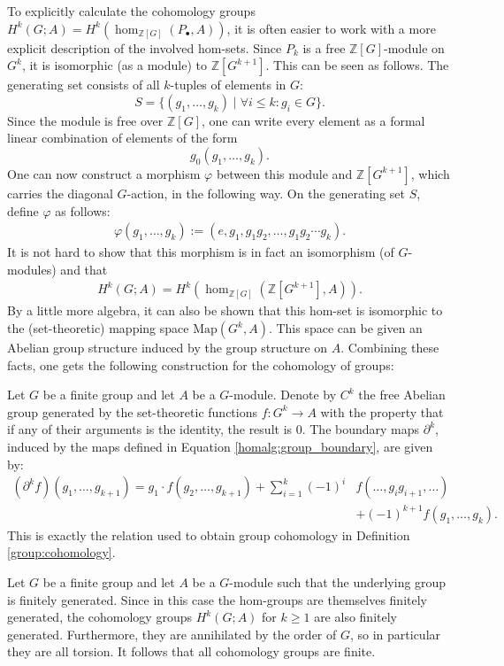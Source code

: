 	To explicitly calculate the cohomology groups $H^k(G;A) = H^k(\hom_{\mathbb{Z}[G]}(P_\bullet,A))$, it is often easier to work with a more explicit description of the involved hom-sets. Since $P_k$ is a free $\mathbb{Z}[G]$-module on $G^k$, it is isomorphic (as a module) to $\mathbb{Z}[G^{k+1}]$. This can be seen as follows. The generating set consists of all $k$-tuples of elements in $G$: \[S=\{(g_1,\ldots,g_k)\mid\forall i\leq k:g_i\in G\}.\] Since the module is free over $\mathbb{Z}[G]$, one can write every element as a formal linear combination of elements of the form \[g_0(g_1,\ldots,g_k).\] One can now construct a morphism $\varphi$ between this module and $\mathbb{Z}[G^{k+1}]$, which carries the diagonal $G$-action, in the following way. On the generating set $S$, define $\varphi$ as follows:
	\begin{gather}
		\varphi(g_1,\ldots,g_k) := (e,g_1,g_1g_2,\ldots,g_1g_2\cdots g_k).
	\end{gather}
	It is not hard to show that this morphism is in fact an isomorphism (of $G$-modules) and that
	\begin{gather}
		H^k(G;A) = H^k(\hom_{\mathbb{Z}[G]}(\mathbb{Z}[G^{k+1}],A)).
	\end{gather}
	By a little more algebra, it can also be shown that this hom-set is isomorphic to the (set-theoretic) mapping space $\mathrm{Map}(G^k,A)$. This space can be given an Abelian group structure induced by the group structure on $A$. Combining these facts, one gets the following construction for the cohomology of groups:
	\begin{construct}
		Let $G$ be a finite group and let $A$ be a $G$-module. Denote by $C^k$ the free Abelian group generated by the set-theoretic functions $f:G^k\rightarrow A$ with the property that if any of their arguments is the identity, the result is 0. The boundary maps $\partial^k$, induced by the maps defined in Equation \eqref{homalg:group_boundary}, are given by:
		\begin{align}
			(\partial^k f)(g_1,\ldots,g_{k+1}) = g_1\cdot f(g_2,\ldots,g_{k+1}) + \sum_{i=1}^k(-1)^i&f(\ldots,g_ig_{i+1},\ldots)\\
            &+(-1)^{k+1}f(g_1,\ldots,g_k).\nonumber
		\end{align}
		This is exactly the relation used to obtain group cohomology in Definition \ref{group:cohomology}.
	\end{construct}

	\begin{property}[Finiteness]
		Let $G$ be a finite group and let $A$ be a $G$-module such that the underlying group is finitely generated. Since in this case the hom-groups are themselves finitely generated, the cohomology groups $H^k(G;A)$ for $k\geq1$ are also finitely generated. Furthermore, they are annihilated by the order of $G$, so in particular they are all torsion. It follows that all cohomology groups are finite.
	\end{property}

